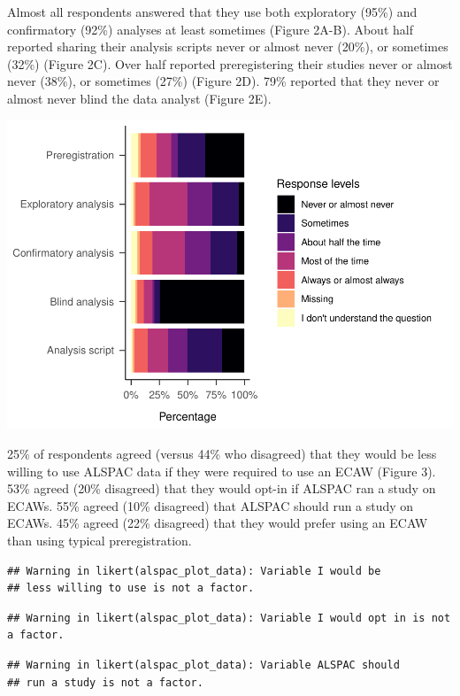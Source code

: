\documentclass[
  man]{apa6}
\begin{document}
Almost all respondents answered that they use both exploratory (95\%) and confirmatory (92\%) analyses at least sometimes (Figure 2A-B). About half reported sharing their analysis scripts never or almost never (20\%), or sometimes (32\%) (Figure 2C). Over half reported preregistering their studies never or almost never (38\%), or sometimes (27\%) (Figure 2D). 79\% reported that they never or almost never blind the data analyst (Figure 2E).

\includegraphics{manuscript_files/figure-latex/unnamed-chunk-10-1.pdf}

25\% of respondents agreed (versus 44\% who disagreed) that they would be less willing to use ALSPAC data if they were required to use an ECAW (Figure 3). 53\% agreed (20\% disagreed) that they would opt-in if ALSPAC ran a study on ECAWs. 55\% agreed (10\% disagreed) that ALSPAC should run a study on ECAWs. 45\% agreed (22\% disagreed) that they would prefer using an ECAW than using typical preregistration.

\begin{verbatim}
## Warning in likert(alspac_plot_data): Variable I would be
## less willing to use is not a factor.
\end{verbatim}

\begin{verbatim}
## Warning in likert(alspac_plot_data): Variable I would opt in is not a factor.
\end{verbatim}

\begin{verbatim}
## Warning in likert(alspac_plot_data): Variable ALSPAC should
## run a study is not a factor.
\end{verbatim}
\end{document}
